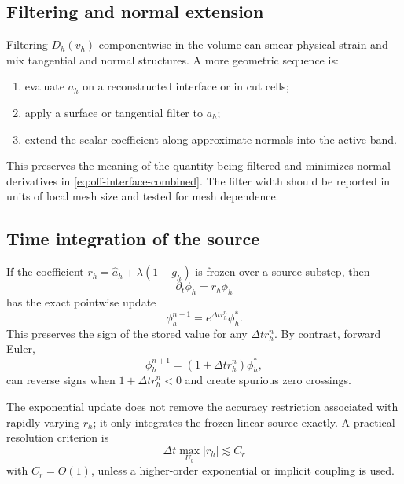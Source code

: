 \documentclass[11pt,a4paper]{article}
\theoremstyle{definition}
\theoremstyle{remark}
\newcommand{\abs}[1]{\left\lvert #1\right\rvert}
\begin{document}
\subsection{Filtering and normal extension}

Filtering $D_h(v_h)$ componentwise in the volume can smear physical strain and mix tangential and normal structures. A more geometric sequence is:
\begin{enumerate}
  \item evaluate $a_h$ on a reconstructed interface or in cut cells;
  \item apply a surface or tangential filter to $a_h$;
  \item extend the scalar coefficient along approximate normals into the active band.
\end{enumerate}
This preserves the meaning of the quantity being filtered and minimizes normal derivatives in \eqref{eq:off-interface-combined}. The filter width should be reported in units of local mesh size and tested for mesh dependence.

\subsection{Time integration of the source}

If the coefficient $r_h=\widehat a_h+\lambda(1-g_h)$ is frozen over a source substep, then
\begin{equation}
  \partial_t\phi_h=r_h\phi_h
\end{equation}
has the exact pointwise update
\begin{equation}
  \boxed{
  \phi_h^{n+1}=e^{\Delta t r_h^n}\phi_h^*.
  }
  \label{eq:exponential-source}
\end{equation}
This preserves the sign of the stored value for any $\Delta t r_h^n$. By contrast, forward Euler,
\begin{equation}
  \phi_h^{n+1}=(1+\Delta t r_h^n)\phi_h^*,
\end{equation}
can reverse signs when $1+\Delta t r_h^n<0$ and create spurious zero crossings.

The exponential update does not remove the accuracy restriction associated with rapidly varying $r_h$; it only integrates the frozen linear source exactly. A practical resolution criterion is
\begin{equation}
  \Delta t\max_{U_b}\abs{r_h}\lesssim C_r
\end{equation}
with $C_r=O(1)$, unless a higher-order exponential or implicit coupling is used.
\end{document}
